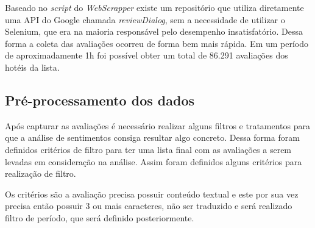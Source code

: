 Baseado no \emph{script} do \emph{WebScrapper} existe um repositório que utiliza diretamente uma API do Google chamada \emph{reviewDialog}, sem a necessidade de utilizar o Selenium, que era na maioria responsável pelo desempenho insatisfatório. Dessa forma a coleta das avaliações ocorreu de forma bem mais rápida. Em um período de aproximadamente 1h foi possível obter um total de 86.291 avaliações dos hotéis da lista.

\subsection{Pré-processamento dos dados}
\label{cap:metodologia:sec:conjunto_dados:sec:pre_processamento}

Após capturar as avaliações é necessário realizar alguns filtros e tratamentos para que a análise de sentimentos consiga resultar algo concreto. Dessa forma foram definidos critérios de filtro para ter uma lista final com as avaliações a serem levadas em consideração na análise. Assim foram definidos alguns critérios para realização de filtro.

Os critérios são a avaliação precisa possuir conteúdo textual e este por sua vez precisa então possuir 3 ou mais caracteres, não ser traduzido e será realizado filtro de período, que será definido posteriormente.

